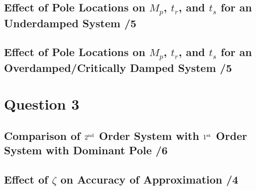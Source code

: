 \documentclass{article}
\newcommand{\score}{\hfill \underline{\hspace{1cm}}/}
\begin{document}
\subsection*{Effect of Pole Locations on $M_p$, $t_r$, and $t_s$ for an Underdamped System \score 5}

\subsection*{Effect of Pole Locations on $M_p$, $t_r$, and $t_s$ for an Overdamped/Critically Damped System \score 5}

\section*{Question 3}

\subsection*{Comparison of $2^{\rm nd}$ Order System with $1^{\rm st}$ Order System with Dominant Pole \score 6}

\subsection*{Effect of $\zeta$ on Accuracy of Approximation \score 4}
\end{document}
